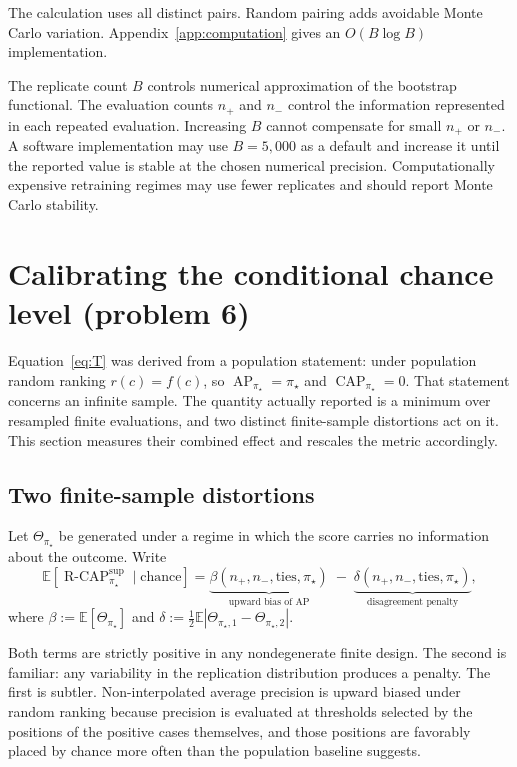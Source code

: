 \documentclass[11pt]{article}
\newcommand{\AP}{\operatorname{AP}}
\newcommand{\CAP}{\operatorname{CAP}}
\newcommand{\Tpi}{\CAP_{\pi_\star}}
\newcommand{\E}{\mathbb{E}}
\newcommand{\RCAP}{\operatorname{R\text{-}CAP}^{\mathrm{sup}}_{\pi_\star}}
\theoremstyle{remark}
\begin{document}
The calculation uses all distinct pairs. Random pairing adds avoidable Monte Carlo variation. Appendix~\ref{app:computation} gives an $O(B\log B)$ implementation.

The replicate count $B$ controls numerical approximation of the bootstrap functional. The evaluation counts $n_+$ and $n_-$ control the information represented in each repeated evaluation. Increasing $B$ cannot compensate for small $n_+$ or $n_-$. A software implementation may use $B=5{,}000$ as a default and increase it until the reported value is stable at the chosen numerical precision. Computationally expensive retraining regimes may use fewer replicates and should report Monte Carlo stability.

\section{Calibrating the conditional chance level (problem 6)}
\label{sec:calibration}

Equation~\eqref{eq:T} was derived from a population statement: under population random ranking $r(c)=f(c)$, so $\AP_{\pi_\star}=\pi_\star$ and $\Tpi=0$. That statement concerns an infinite sample. The quantity actually reported is a minimum over resampled finite evaluations, and two distinct finite-sample distortions act on it. This section measures their combined effect and rescales the metric accordingly.

\subsection{Two finite-sample distortions}

Let $\Theta_{\pi_\star}$ be generated under a regime in which the score carries no information about the outcome. Write
\begin{equation}
\E\!\left[\RCAP \mid \text{chance}\right]
=
\underbrace{\beta(n_+,n_-,\text{ties},\pi_\star)}_{\text{upward bias of }\AP}
\;-\;
\underbrace{\delta(n_+,n_-,\text{ties},\pi_\star)}_{\text{disagreement penalty}} ,
\label{eq:two-distortions}
\end{equation}
where $\beta:=\E[\Theta_{\pi_\star}]$ and $\delta:=\tfrac12\E|\Theta_{\pi_\star,1}-\Theta_{\pi_\star,2}|$.

Both terms are strictly positive in any nondegenerate finite design. The second is familiar: any variability in the replication distribution produces a penalty. The first is subtler. Non-interpolated average precision is upward biased under random ranking because precision is evaluated at thresholds selected by the positions of the positive cases themselves, and those positions are favorably placed by chance more often than the population baseline suggests.
\end{document}
